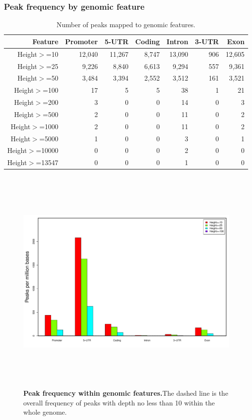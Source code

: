 \documentclass{article}
\begin{document}
\subsubsection{Peak frequency by genomic feature}
{\tiny
\begin{longtable}{|r|r|r|r|r|r|r|}
\caption{Number of peaks mapped to genomic features.} \\ 
  \hline
Feature & Promoter & 5-UTR & Coding & Intron & 3-UTR & Exon \\ 
  \hline
Height$>$=10 & 12,040 & 11,267 & 8,747 & 13,090 & 906 & 12,605 \\ 
   \rowcolor[gray]{0.9}Height$>$=25 & 9,226 & 8,840 & 6,613 & 9,294 & 557 & 9,361 \\ 
  Height$>$=50 & 3,484 & 3,394 & 2,552 & 3,512 & 161 & 3,521 \\ 
   \rowcolor[gray]{0.9}Height$>$=100 & 17 & 5 & 5 & 38 &   1 & 21 \\ 
  Height$>$=200 & 3 & 0 & 0 & 14 &   0 & 3 \\ 
   \rowcolor[gray]{0.9}Height$>$=500 & 2 & 0 & 0 & 11 &   0 & 2 \\ 
  Height$>$=1000 & 2 & 0 & 0 & 11 &   0 & 2 \\ 
   \rowcolor[gray]{0.9}Height$>$=5000 & 1 & 0 & 0 & 3 &   0 & 1 \\ 
  Height$>$=10000 & 0 & 0 & 0 & 2 &   0 & 0 \\ 
   \rowcolor[gray]{0.9}Height$>$=13547 & 0 & 0 & 0 & 1 &   0 & 0 \\ 
   \hline
\hline
\end{longtable}
}
\begin{center}
\begin{figure}[H]
\includegraphics[width=7in, height=4.5in, page=1]{bamchop-chip-peak-by-feature}
\caption{\textbf{Peak frequency within genomic features.}The dashed line is the overall frequency of peaks with depth no less than 10 within the whole genome.}
\end{figure}
\end{center}
\end{document}

